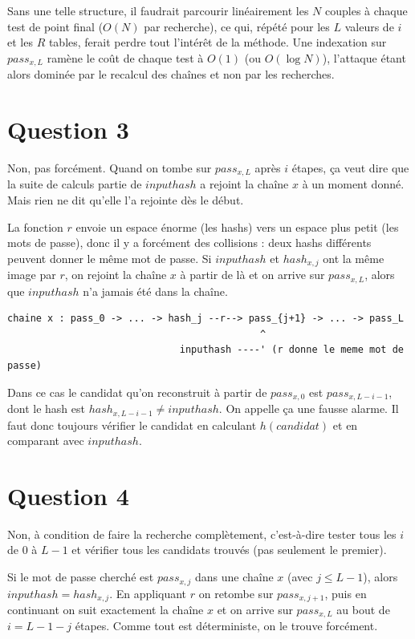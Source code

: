 \documentclass{article}
\begin{document}
Sans une telle structure, il faudrait parcourir linéairement les $N$ couples à chaque
test de point final ($O(N)$ par recherche), ce qui, répété pour les $L$ valeurs de $i$
et les $R$ tables, ferait perdre tout l'intérêt de la méthode. Une indexation sur
$pass_{x,L}$ ramène le coût de chaque test à $O(1)$ (ou $O(\log N)$), l'attaque étant
alors dominée par le recalcul des chaînes et non par les recherches.

\section*{Question 3}

Non, pas forcément. Quand on tombe sur $pass_{x,L}$ après $i$ étapes, ça veut dire que la suite de calculs partie de $inputhash$ a rejoint la chaîne $x$ à un moment donné. Mais rien ne dit qu'elle l'a rejointe dès le début.

La fonction $r$ envoie un espace énorme (les hashs) vers un espace plus petit (les mots de passe), donc il y a forcément des collisions : deux hashs différents peuvent donner le même mot de passe. Si $inputhash$ et $hash_{x,j}$ ont la même image par $r$, on rejoint la chaîne $x$ à partir de là et on arrive sur $pass_{x,L}$, alors que $inputhash$ n'a jamais été dans la chaîne.

\begin{verbatim}
chaine x : pass_0 -> ... -> hash_j --r--> pass_{j+1} -> ... -> pass_L
                                            ^
                              inputhash ----' (r donne le meme mot de passe)
\end{verbatim}

Dans ce cas le candidat qu'on reconstruit à partir de $pass_{x,0}$ est $pass_{x,L-i-1}$, dont le hash est $hash_{x,L-i-1} \neq inputhash$. On appelle ça une fausse alarme. Il faut donc toujours vérifier le candidat en calculant $h(candidat)$ et en comparant avec $inputhash$.

\section*{Question 4}

Non, à condition de faire la recherche complètement, c'est-à-dire tester tous les $i$ de $0$ à $L-1$ et vérifier tous les candidats trouvés (pas seulement le premier).

Si le mot de passe cherché est $pass_{x,j}$ dans une chaîne $x$ (avec $j \leq L-1$), alors $inputhash = hash_{x,j}$. En appliquant $r$ on retombe sur $pass_{x,j+1}$, puis en continuant on suit exactement la chaîne $x$ et on arrive sur $pass_{x,L}$ au bout de $i = L-1-j$ étapes. Comme tout est déterministe, on le trouve forcément.
\end{document}
